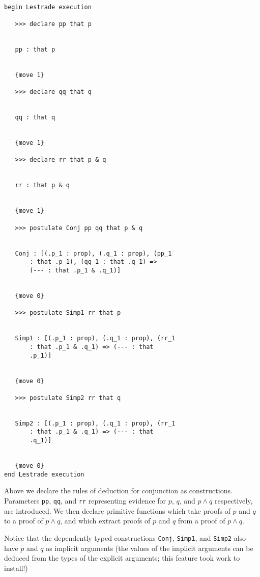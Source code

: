 \documentclass[12pt]{article}
\begin{document}
\begin{verbatim}

begin Lestrade execution

   >>> declare pp that p


   pp : that p


   {move 1}

   >>> declare qq that q


   qq : that q


   {move 1}

   >>> declare rr that p & q


   rr : that p & q


   {move 1}

   >>> postulate Conj pp qq that p & q


   Conj : [(.p_1 : prop), (.q_1 : prop), (pp_1 
       : that .p_1), (qq_1 : that .q_1) => 
       (--- : that .p_1 & .q_1)]


   {move 0}

   >>> postulate Simp1 rr that p


   Simp1 : [(.p_1 : prop), (.q_1 : prop), (rr_1 
       : that .p_1 & .q_1) => (--- : that 
       .p_1)]


   {move 0}

   >>> postulate Simp2 rr that q


   Simp2 : [(.p_1 : prop), (.q_1 : prop), (rr_1 
       : that .p_1 & .q_1) => (--- : that 
       .q_1)]


   {move 0}
end Lestrade execution
\end{verbatim}

Above we declare the rules of deduction for conjunction as constructions.   Parameters {\tt pp}, {\tt qq}, and {\tt rr} representing evidence for $p$, $q$, and $p \wedge q$ respectively, are introduced.  We then declare primitive functions which take proofs of $p$ and $q$ to a proof of $p \wedge q$, and which extract proofs of $p$ and $q$ from a proof of $p \wedge q$.

Notice that the dependently typed constructions {\tt Conj}, {\tt Simp1}, and {\tt Simp2} also have $p$ and $q$ as implicit arguments (the values of the implicit arguments can be deduced from the types of the explicit arguments;  this feature took work to install!)
\end{document}
